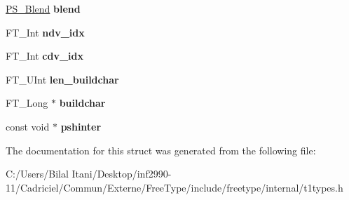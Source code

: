 \begin{DoxyCompactItemize}
\item 
\hyperlink{struct_p_s___blend_rec__}{P\+S\+\_\+\+Blend} {\bfseries blend}\hypertarget{struct_t1___face_rec___a51e4e76f9988ec601d1fec6b5d4611db}{}\label{struct_t1___face_rec___a51e4e76f9988ec601d1fec6b5d4611db}

\item 
F\+T\+\_\+\+Int {\bfseries ndv\+\_\+idx}\hypertarget{struct_t1___face_rec___a0ecadea7618642ccc351f81ac56ec266}{}\label{struct_t1___face_rec___a0ecadea7618642ccc351f81ac56ec266}

\item 
F\+T\+\_\+\+Int {\bfseries cdv\+\_\+idx}\hypertarget{struct_t1___face_rec___a7a77dcddf65ac6d86f1f62b3859d11d8}{}\label{struct_t1___face_rec___a7a77dcddf65ac6d86f1f62b3859d11d8}

\item 
F\+T\+\_\+\+U\+Int {\bfseries len\+\_\+buildchar}\hypertarget{struct_t1___face_rec___a75554021d0baddb1c64f69fd8dbde86b}{}\label{struct_t1___face_rec___a75554021d0baddb1c64f69fd8dbde86b}

\item 
F\+T\+\_\+\+Long $\ast$ {\bfseries buildchar}\hypertarget{struct_t1___face_rec___af1fd890acaa0f423f7cc36807c42d75f}{}\label{struct_t1___face_rec___af1fd890acaa0f423f7cc36807c42d75f}

\item 
const void $\ast$ {\bfseries pshinter}\hypertarget{struct_t1___face_rec___a438e8ce8cbd53b7e205b17f95e7b2106}{}\label{struct_t1___face_rec___a438e8ce8cbd53b7e205b17f95e7b2106}

\end{DoxyCompactItemize}


The documentation for this struct was generated from the following file\+:\begin{DoxyCompactItemize}
\item 
C\+:/\+Users/\+Bilal Itani/\+Desktop/inf2990-\/11/\+Cadriciel/\+Commun/\+Externe/\+Free\+Type/include/freetype/internal/t1types.\+h\end{DoxyCompactItemize}
